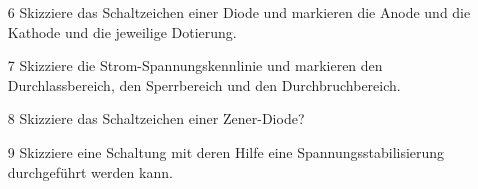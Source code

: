 \begin{enumerate}
\itemsep1pt\parskip0pt
\item[6] Skizziere das Schaltzeichen einer Diode und markieren die Anode und die Kathode und die jeweilige Dotierung.
    \loesung{\centering }
\item[7] Skizziere die Strom-Spannungskennlinie und markieren den Durchlassbereich, den Sperrbereich und den Durchbruchbereich.
\item[8] Skizziere das Schaltzeichen einer Zener-Diode?
	\loesung{\centering }
\item[9] Skizziere eine Schaltung mit deren Hilfe eine Spannungsstabilisierung durchgeführt werden kann.
	\loesung{\centering }
\end{enumerate}
